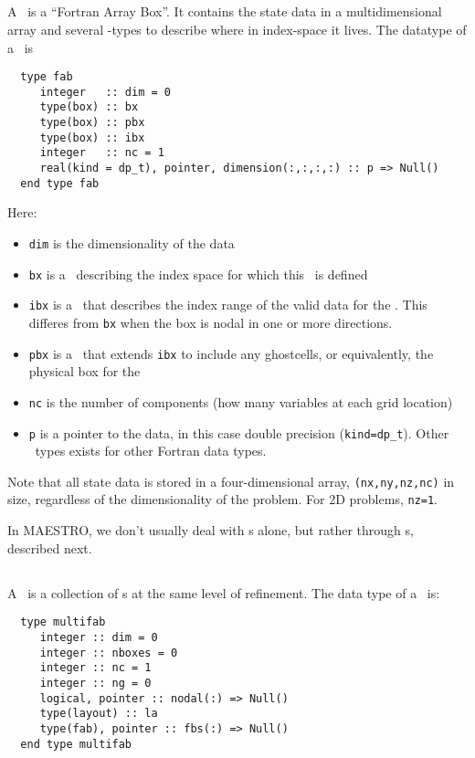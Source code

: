 \subsection{\fab}

A \fab\ is a ``Fortran Array Box''.  It contains the state data in a
multidimensional array and several \boxtype-types to describe where in
index-space it lives.  The datatype of a \fab\ is
\begin{verbatim}
  type fab
     integer   :: dim = 0
     type(box) :: bx
     type(box) :: pbx
     type(box) :: ibx
     integer   :: nc = 1
     real(kind = dp_t), pointer, dimension(:,:,:,:) :: p => Null()
  end type fab
\end{verbatim}
 
\noindent Here:
\begin{itemize}
\item {\tt dim} is the dimensionality of the data
\item {\tt bx} is a \boxtype\ describing the index space for which this \fab\ is defined
\item {\tt ibx} is a \boxtype\ that describes the index range of the valid data
  for the \fab.  This differes from {\tt bx} when the box is nodal in one or more 
  directions.
\item {\tt pbx} is a \boxtype\ that extends {\tt ibx} to include
  any ghostcells, or equivalently, the physical box for the \fab\
\item {\tt nc} is the number of components (how many variables at  
  each grid location)
\item {\tt p} is a pointer to the data, in this case double precision
  ({\tt kind=dp\_t}).  Other \fab\ types exists for other Fortran
  data types.
\end{itemize}


Note that all state data is stored in a four-dimensional array,
{\tt (nx,ny,nz,nc)} in size, regardless of the dimensionality of the
problem.  For 2D problems, {\tt nz=1}.

In MAESTRO, we don't usually deal with \fab s alone, but rather
through \multifab s, described next.

\subsection{\multifab}

A \multifab\ is a collection of \fab s at the same level of
refinement.  The data type of a \multifab\ is:
\begin{verbatim}
  type multifab
     integer :: dim = 0
     integer :: nboxes = 0
     integer :: nc = 1
     integer :: ng = 0
     logical, pointer :: nodal(:) => Null()
     type(layout) :: la
     type(fab), pointer :: fbs(:) => Null()
  end type multifab
\end{verbatim}




